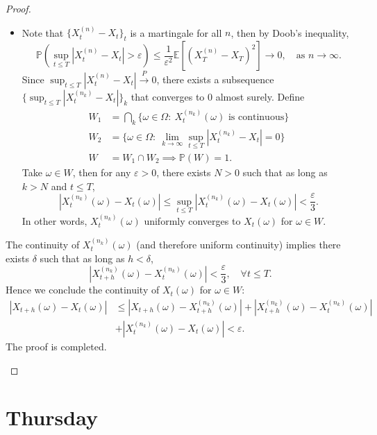 \begin{proof}
\begin{enumerate}
\begin{itemize}
\item
Note that $\{X_t^{(n)}-X_t\}_{t}$ is a martingale for all $n$, then by Doob's inequality,
\[
\mathbb{P}\left(
\sup_{t\le T}|X_t^{(n)}-X_t|>\varepsilon
\right)\le\frac{1}{\varepsilon^2}\mathbb{E}\left[
(X_T^{(n)}-X_T)^2
\right]\to0,\quad\text{as }n\to\infty.
\]
Since $\sup_{t\le T}|X_t^{(n)}-X_t|\xrightarrow{P}0$, there exists a subsequence $\{\sup_{t\le T}|X_t^{(n_k)}-X_t|\}_k$ that converges to $0$ almost surely.
Define 
\begin{align*}
W_1&=\bigcap_k\bigg\{
\omega\in\Omega:~X_t^{(n_k)}(\omega)\text{ is continuous}
\bigg\}\\
W_2&=\bigg\{
\omega\in\Omega:~\lim_{k\to\infty}\sup_{t\le T}|X_t^{(n_k)}-X_t|=0
\bigg\}\\
W&=W_1\cap W_2\implies \mathbb{P}(W)=1.
\end{align*}
Take $\omega\in W$, then for any $\varepsilon>0$, there exists $N>0$ such that as long as $k>N$ and $t\le T$,
\[
|X_t^{(n_k)}(\omega)-X_t(\omega)|\le \sup_{t\le T}|X_t^{(n_k)}(\omega)-X_t(\omega)|<\frac{\varepsilon}{3}.
\]
In other words, $X_t^{(n_k)}(\omega)$ uniformly converges to $X_t(\omega)$ for $\omega\in W$.
\end{itemize}
The continuity of $X_t^{(n_k)}(\omega)$ (and therefore uniform continuity) implies there exists $\delta$ such that as long as $h<\delta$,
\[
|X_{t+h}^{(n_k)}(\omega)-X_{t}^{(n_k)}(\omega)|<\frac{\varepsilon}{3},\quad\forall t\le T.
\]
Hence we conclude the continuity of $X_t(\omega)$ for $\omega\in W$:
\begin{align*}
|X_{t+h}(\omega)-X_t(\omega)|&\le |X_{t+h}(\omega)-X_{t+h}^{(n_k)}(\omega)|
+|X_{t+h}^{(n_k)}(\omega)-X_{t}^{(n_k)}(\omega)|\\&+|X_{t}^{(n_k)}(\omega)-X_t(\omega)|<\varepsilon.
\end{align*}
The proof is completed.


\end{enumerate}
\end{proof}
\section{Thursday}


